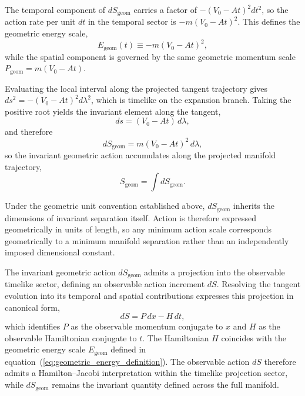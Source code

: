 \documentclass[fontsize=12pt, paper=a4]{scrartcl}
\begin{document}
The temporal component of $dS_{\mathrm{geom}}$ carries a factor of $-(V_0-At)^2 dt^2$, so the action rate per unit $dt$ in the temporal sector is $-m(V_0-At)^2$. This defines the geometric energy scale,
\begin{equation}
E_{\mathrm{geom}}(t)\equiv -m(V_0-At)^2,
\label{eq:geometric_energy_definition}
\end{equation}
while the spatial component is governed by the same geometric momentum scale $P_{\mathrm{geom}}=m(V_0-At)$.

Evaluating the local interval along the projected tangent trajectory gives $ds^2 = -(V_0-At)^2 d\lambda^2$, which is timelike on the expansion branch. Taking the positive root yields the invariant element along the tangent,
\begin{equation}
ds=(V_0-At)\,d\lambda,
\end{equation}
and therefore
\begin{equation}
dS_{\mathrm{geom}} = m(V_0-At)^2\,d\lambda,
\label{eq:action_definition}
\end{equation}
so the invariant geometric action accumulates along the projected manifold trajectory,
\begin{equation}
S_{\mathrm{geom}} = \int dS_{\mathrm{geom}}.
\end{equation}

Under the geometric unit convention established above, $dS_{\mathrm{geom}}$ inherits the dimensions of invariant separation itself. Action is therefore expressed geometrically in units of length, so any minimum action scale corresponds geometrically to a minimum manifold separation rather than an independently imposed dimensional constant.

The invariant geometric action $dS_{\mathrm{geom}}$ admits a projection into the observable timelike sector, defining an observable action increment $dS$. Resolving the tangent evolution into its temporal and spatial contributions expresses this projection in canonical form,
\begin{equation}
dS = P\,dx - H\,dt,
\end{equation}
which identifies $P$ as the observable momentum conjugate to $x$ and $H$ as the observable Hamiltonian conjugate to $t$. The Hamiltonian $H$ coincides with the geometric energy scale $E_{\mathrm{geom}}$ defined in equation~(\ref{eq:geometric_energy_definition}). The observable action $dS$ therefore admits a Hamilton--Jacobi interpretation within the timelike projection sector, while $dS_{\mathrm{geom}}$ remains the invariant quantity defined across the full manifold.
\end{document}
